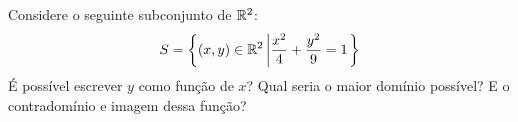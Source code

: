 Considere o seguinte subconjunto de $\mathbb{R}^2$:
\[
	S=\left\{(x,y)\in\mathbb{R}^2\left|\frac{x^2}{4}+\frac{y^2}{9}=1\right.\right\}
\]
É possível escrever $y$ como função de $x$? Qual seria o maior domínio possível? E o contradomínio e imagem dessa função?
